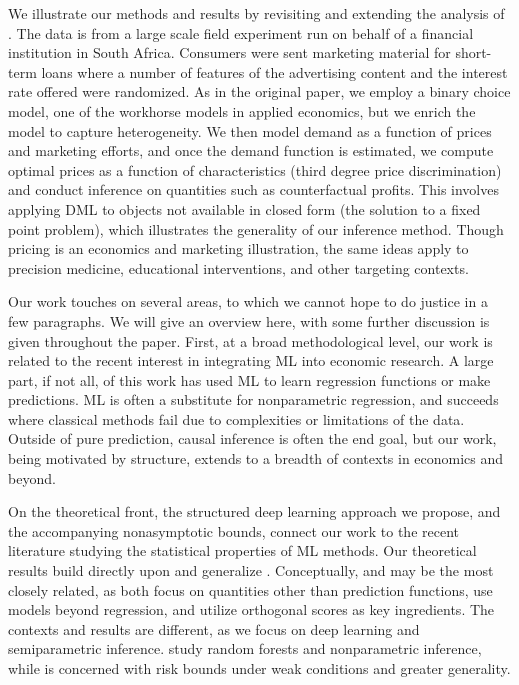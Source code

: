 \documentclass[12pt]{article}
\numberwithin{equation}{section}
\theoremstyle{definition}
\begin{document}
We illustrate our methods and results by revisiting and extending the analysis of \cite{Bertrand-etal2010_QJE}. The data is from a large scale field experiment run on behalf of a financial institution in South Africa. Consumers were sent marketing material for short-term loans where a number of features of the advertising content and the interest rate offered were randomized. As in the original paper, we employ a binary choice model, one of the workhorse models in applied economics, but we enrich the model to capture heterogeneity. We then model demand as a function of prices and marketing efforts, and once the demand function is estimated, we compute optimal prices as a function of characteristics (third degree price discrimination) and conduct inference on quantities such as counterfactual profits. This involves applying DML to objects not available in closed form (the solution to a fixed point problem), which illustrates the generality of our inference method. Though pricing is an economics and marketing illustration, the same ideas apply to precision medicine, educational interventions, and other targeting contexts.



Our work touches on several areas, to which we cannot hope to do justice in a few paragraphs. We will give an overview here, with some further discussion is given throughout the paper. First, at a broad methodological level, our work is related to the recent interest in integrating ML into economic research. A large part, if not all, of this work has used ML to learn regression functions or make predictions. ML is often a substitute for nonparametric regression, and succeeds where classical methods fail due to complexities or limitations of the data. Outside of pure prediction, causal inference is often the end goal, but our work, being motivated by structure, extends to a breadth of contexts in economics and beyond.


On the theoretical front, the structured deep learning approach we propose, and the accompanying nonasymptotic bounds, connect our work to the recent literature studying the statistical properties of ML methods. Our theoretical results build directly upon and generalize \cite{Farrell-Liang-Misra2021_Ecma}. Conceptually, \cite{Athey-Tibshirani-Wager2019_AoS} and \cite{Foster-Syrgkanis2023_AoS} may be the most closely related, as both focus on quantities other than prediction functions, use models beyond regression, and utilize orthogonal scores as key ingredients. The contexts and results are different, as we focus on deep learning and semiparametric inference. \cite{Athey-Tibshirani-Wager2019_AoS} study random forests and nonparametric inference, while \cite{Foster-Syrgkanis2023_AoS} is concerned with risk bounds under weak conditions and greater generality.
\end{document}
